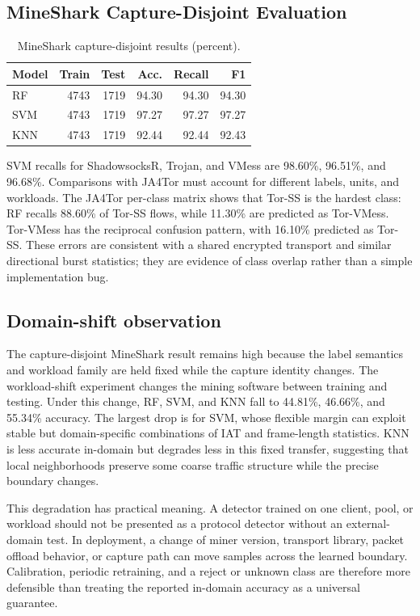 \documentclass[conference]{IEEEtran}
\begin{document}
\subsection{MineShark Capture-Disjoint Evaluation}
\begin{table}[t]
\caption{MineShark capture-disjoint results (percent).}
\label{tab:mineshark}
\centering
\small
\begin{tabular}{lrrrrr}
\toprule
Model & Train & Test & Acc. & Recall & F1\\
\midrule
RF & 4743 & 1719 & 94.30 & 94.30 & 94.30\\
SVM & 4743 & 1719 & 97.27 & 97.27 & 97.27\\
KNN & 4743 & 1719 & 92.44 & 92.44 & 92.43\\
\bottomrule
\end{tabular}
\end{table}

SVM recalls for ShadowsocksR, Trojan, and VMess are 98.60\%, 96.51\%, and 96.68\%. Comparisons with JA4Tor must account for different labels, units, and workloads. The JA4Tor per-class matrix shows that Tor-SS is the hardest class: RF recalls 88.60\% of Tor-SS flows, while 11.30\% are predicted as Tor-VMess. Tor-VMess has the reciprocal confusion pattern, with 16.10\% predicted as Tor-SS. These errors are consistent with a shared encrypted transport and similar directional burst statistics; they are evidence of class overlap rather than a simple implementation bug.
\subsection{Domain-shift observation}
The capture-disjoint MineShark result remains high because the label semantics and workload family are held fixed while the capture identity changes. The workload-shift experiment changes the mining software between training and testing. Under this change, RF, SVM, and KNN fall to 44.81\%, 46.66\%, and 55.34\% accuracy. The largest drop is for SVM, whose flexible margin can exploit stable but domain-specific combinations of IAT and frame-length statistics. KNN is less accurate in-domain but degrades less in this fixed transfer, suggesting that local neighborhoods preserve some coarse traffic structure while the precise boundary changes.

This degradation has practical meaning. A detector trained on one client, pool, or workload should not be presented as a protocol detector without an external-domain test. In deployment, a change of miner version, transport library, packet offload behavior, or capture path can move samples across the learned boundary. Calibration, periodic retraining, and a reject or unknown class are therefore more defensible than treating the reported in-domain accuracy as a universal guarantee.
\end{document}
